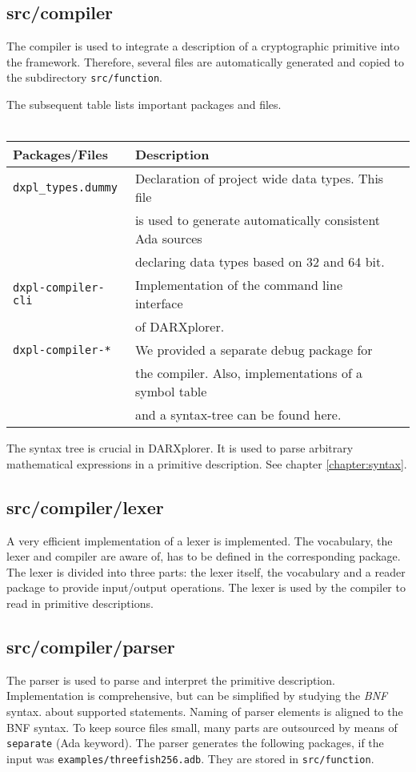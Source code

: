 \documentclass{acmtrans2m}
\begin{document}
\subsection{src/compiler}
The compiler is used to integrate a description of a cryptographic primitive into the
framework. Therefore, several files are automatically generated and copied to the subdirectory \texttt{src/function}.

The subsequent table lists important packages and files.\\ \\
\medskip
\begin{tabular}{l l l}
        Packages/Files & Description\\
\hline
        \verb|dxpl_types.dummy| & Declaration of project wide data types. This file\\
        & is used to generate automatically consistent Ada sources\\
        & declaring data types based on 32 and 64 bit.\\
        \verb|dxpl-compiler-cli| & Implementation of the command line interface\\
        & of DARXplorer.\\
        \verb|dxpl-compiler-*| & We provided a separate debug package for\\
        & the compiler. Also, implementations of a symbol table\\
        & and a syntax-tree can be found here.
\end{tabular}

The syntax tree is crucial in DARXplorer. It is used to parse arbitrary mathematical
expressions in a primitive description. See chapter \ref{chapter:syntax}.

\subsection{src/compiler/lexer}
A very efficient implementation of a lexer is implemented. The vocabulary,
the lexer and compiler are aware of, has to be defined in the corresponding
package. The lexer is divided into three parts: the lexer itself, the vocabulary
and a reader package to provide input/output operations. The lexer is used
by the compiler to read in primitive descriptions.

\subsection{src/compiler/parser}
The parser is used to parse and interpret the primitive description. Implementation
is comprehensive, but can be simplified by studying the \textit{BNF} syntax.
about supported statements. Naming of parser elements is aligned to the
BNF syntax. To keep source files small, many parts are outsourced by means
of \texttt{separate} (Ada keyword). The parser generates the following packages, if the input was \texttt{examples/threefish256.adb}. They are stored in \texttt{src/function}.\\ \\
\end{document}
